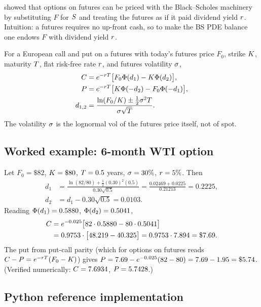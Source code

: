 \citet{black1976pricing} showed that options on futures can be
priced with the Black--Scholes machinery by substituting $F$ for
$S$ and treating the futures as if it paid dividend yield
$r$.  Intuition: a futures requires no up-front cash, so to make
the BS PDE balance one endows $F$ with dividend yield $r$.

\begin{keyfactbox}
For a European call and put on a futures with today's futures price
$F_0$, strike $K$, maturity $T$, flat risk-free rate
$r$, and futures volatility $\sigma$,
\begin{align*}
  C &= e^{-r T}\bigl[F_0 \Phi(d_1) - K \Phi(d_2)\bigr], \\
  P  &= e^{-r T}\bigl[K \Phi(-d_2) - F_0 \Phi(-d_1)\bigr], \\
  d_{1,2} &= \frac{\ln(F_0/K) \pm \tfrac12 \sigma^2 T}{\sigma \sqrt{T}}.
\end{align*}
The volatility $\sigma$ is the lognormal vol of the futures price
itself, not of spot.
\end{keyfactbox}

\subsection{Worked example: 6-month WTI option}

Let $F_0 = \$82$, $K = \$80$, $T = 0.5$ years,
$\sigma = 30\%$, $r = 5\%$.  Then
\begin{align*}
  d_1 &= \frac{\ln(82/80) + \tfrac12 (0.30)^2 (0.5)}{0.30 \sqrt{0.5}}
       = \frac{0.02469 + 0.0225}{0.21213} = 0.2225, \\
  d_2 &= d_1 - 0.30 \sqrt{0.5} = 0.0103.
\end{align*}
Reading $\Phi(d_1) = 0.5880$, $\Phi(d_2) = 0.5041$,
\begin{align*}
  C &= e^{-0.025}\bigl[82 \cdot 0.5880 - 80 \cdot 0.5041\bigr] \\
        &= 0.9753 \cdot \bigl[48.219 - 40.325\bigr] = 0.9753 \cdot 7.894
         = \$7.69.
\end{align*}
The put from put-call parity (which for options on futures reads
$C - P = e^{-r T}(F_0 - K)$) gives
$P = 7.69 - e^{-0.025}(82-80) = 7.69 - 1.95 = \$5.74$.
(Verified numerically: $C = 7.6934$, $P = 5.7428$.)

\subsection{Python reference implementation}

